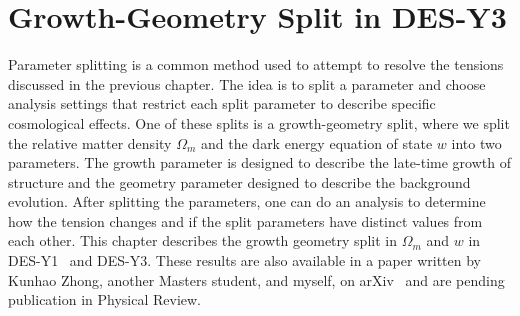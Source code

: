 \chapter{Growth-Geometry Split in DES-Y3}
Parameter splitting is a common method used to attempt to resolve the tensions discussed in the previous chapter. The idea is to split a parameter and choose analysis settings that restrict each split parameter to describe specific cosmological effects. One of these splits is a growth-geometry split, where we split the relative matter density $\Omega_m$ and the dark energy equation of state $w$ into two parameters. The growth parameter is designed to describe the late-time growth of structure and the geometry parameter designed to describe the background evolution. After splitting the parameters, one can do an analysis to determine how the tension changes and if the split parameters have distinct values from each other. This chapter describes the growth geometry split in $\Omega_m$ and $w$ in DES-Y1~\cite{muir_y1_2021} and DES-Y3. These results are also available in a paper written by Kunhao Zhong, another Masters student, and myself, on arXiv~\cite{zhong_growth_2023} and are pending publication in Physical Review.
